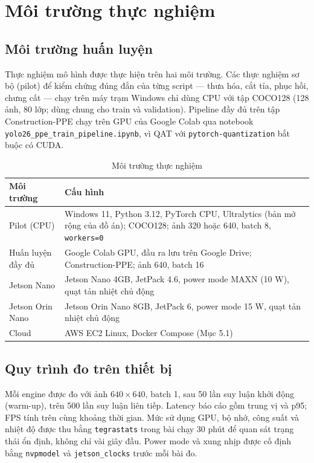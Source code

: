 \section{Môi trường thực nghiệm}

\subsection{Môi trường huấn luyện}

Thực nghiệm mô hình được thực hiện trên hai môi trường. Các thực nghiệm sơ bộ
(pilot) để kiểm chứng đúng đắn của từng script --- thưa hóa, cắt tỉa, phục hồi,
chưng cất --- chạy trên máy trạm Windows chỉ dùng CPU với tập COCO128 (128 ảnh,
80 lớp; dùng chung cho train và validation). Pipeline đầy đủ trên tập
Construction-PPE chạy trên GPU của Google Colab qua notebook
\texttt{yolo26\_ppe\_train\_pipeline.ipynb}, vì QAT với \texttt{pytorch-quantization}
bắt buộc có CUDA.

\begin{table}[H]
\centering
\caption{Môi trường thực nghiệm}
\label{tab:experiment-devices}
\begin{tabularx}{\textwidth}{L{3.4cm}Y}
\toprule
\textbf{Môi trường} & \textbf{Cấu hình}\\
\midrule
Pilot (CPU) & Windows 11, Python 3.12, PyTorch CPU, Ultralytics (bản mở rộng của đồ án); COCO128; ảnh 320 hoặc 640, batch 8, \texttt{workers=0}\\
Huấn luyện đầy đủ & Google Colab GPU, đầu ra lưu trên Google Drive; Construction-PPE; ảnh 640, batch 16\\
Jetson Nano & Jetson Nano 4GB, JetPack 4.6, power mode MAXN (10 W), quạt tản nhiệt chủ động\\
Jetson Orin Nano & Jetson Orin Nano 8GB, JetPack 6, power mode 15 W, quạt tản nhiệt chủ động\\
Cloud & AWS EC2 Linux, Docker Compose (Mục 5.1)\\
\bottomrule
\end{tabularx}
\end{table}

\subsection{Quy trình đo trên thiết bị}

Mỗi engine được đo với ảnh $640\times640$, batch 1, sau 50 lần suy luận khởi động
(warm-up), trên 500 lần suy luận liên tiếp. Latency báo cáo gồm trung vị và p95;
FPS tính trên cùng khoảng thời gian. Mức sử dụng GPU, bộ nhớ, công suất và nhiệt
độ được thu bằng \texttt{tegrastats} trong bài chạy 30 phút để quan sát trạng
thái ổn định, không chỉ vài giây đầu. Power mode và xung nhịp được cố định bằng
\texttt{nvpmodel} và \texttt{jetson\_clocks} trước mỗi bài đo.
